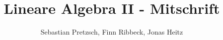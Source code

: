 \documentclass {article}
\begin{document}
\title{Lineare Algebra II - Mitschrift}
\author{Sebastian Pretzsch, Finn Ribbeck, Jonas Heitz}
\maketitle
\end{document}
